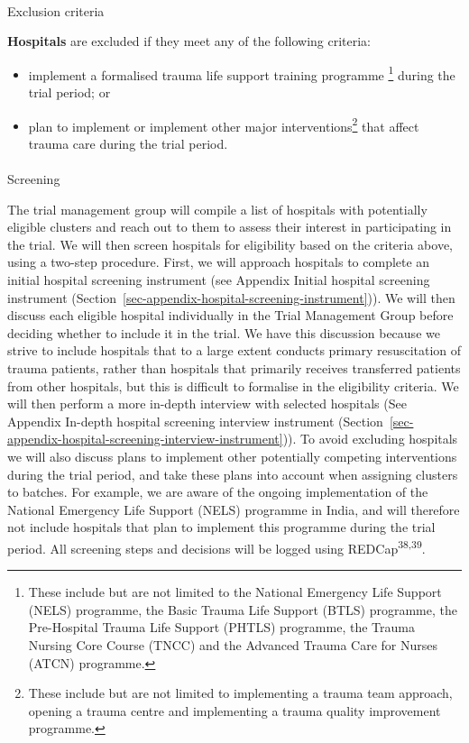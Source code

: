 \documentclass[
]{scrartcl}
\makeatletter
\let\oldparagraph\paragraph
\renewcommand{\paragraph}{
    \@ifstar
      \xxxParagraphStar
      \xxxParagraphNoStar
  }
\newcommand{\xxxParagraphStar}[1]{\oldparagraph*{#1}\mbox{}}
\newcommand{\xxxParagraphNoStar}[1]{\oldparagraph{#1}\mbox{}}
\providecommand{\tightlist}{%
  \setlength{\itemsep}{0pt}\setlength{\parskip}{0pt}}\usepackage{longtable,booktabs,array}
\makeatother
\begin{document}
\paragraph{Exclusion criteria}\label{exclusion-criteria}

\textbf{Hospitals} are excluded if they meet any of the following
criteria:

\begin{itemize}
\tightlist
\item
  implement a formalised trauma life support training programme
  \footnote{These include but are not limited to the National Emergency
    Life Support (NELS) programme, the Basic Trauma Life Support (BTLS)
    programme, the Pre-Hospital Trauma Life Support (PHTLS) programme,
    the Trauma Nursing Core Course (TNCC) and the Advanced Trauma Care
    for Nurses (ATCN) programme.} during the trial period; or
\item
  plan to implement or implement other major interventions\footnote{These
    include but are not limited to implementing a trauma team approach,
    opening a trauma centre and implementing a trauma quality
    improvement programme.} that affect trauma care during the trial
  period.
\end{itemize}

\paragraph{Screening}\label{screening}

The trial management group will compile a list of hospitals with
potentially eligible clusters and reach out to them to assess their
interest in participating in the trial. We will then screen hospitals
for eligibility based on the criteria above, using a two-step procedure.
First, we will approach hospitals to complete an initial hospital
screening instrument (see Appendix Initial hospital screening instrument
(Section~\ref{sec-appendix-hospital-screening-instrument})). We will
then discuss each eligible hospital individually in the Trial Management
Group before deciding whether to include it in the trial. We have this
discussion because we strive to include hospitals that to a large extent
conducts primary resuscitation of trauma patients, rather than hospitals
that primarily receives transferred patients from other hospitals, but
this is difficult to formalise in the eligibility criteria. We will then
perform a more in-depth interview with selected hospitals (See Appendix
In-depth hospital screening interview instrument
(Section~\ref{sec-appendix-hospital-screening-interview-instrument})).
To avoid excluding hospitals we will also discuss plans to implement
other potentially competing interventions during the trial period, and
take these plans into account when assigning clusters to batches. For
example, we are aware of the ongoing implementation of the National
Emergency Life Support (NELS) programme in India, and will therefore not
include hospitals that plan to implement this programme during the trial
period. All screening steps and decisions will be logged using
REDCap\textsuperscript{38,39}.
\end{document}
